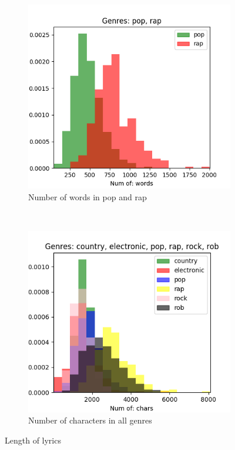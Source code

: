 \documentclass[a4paper, 12pt]{article}
\begin{document}
\begin{figure}[H]
    \centering
    \begin{subfigure}[b]{0.48\textwidth}
        \includegraphics[width=\textwidth]{res/words-pop_rap.png}
        \caption{Number of words in pop and rap}
    \end{subfigure}
    ~ %
    \begin{subfigure}[b]{0.48\textwidth}
        \includegraphics[width=\textwidth]{res/chars-country_electronic_pop_rap_rock_rob.png}
        \caption{Number of characters in all genres}
    \end{subfigure}
    \caption{Length of lyrics}
    \label{fig:words}
\end{figure}
\end{document}
